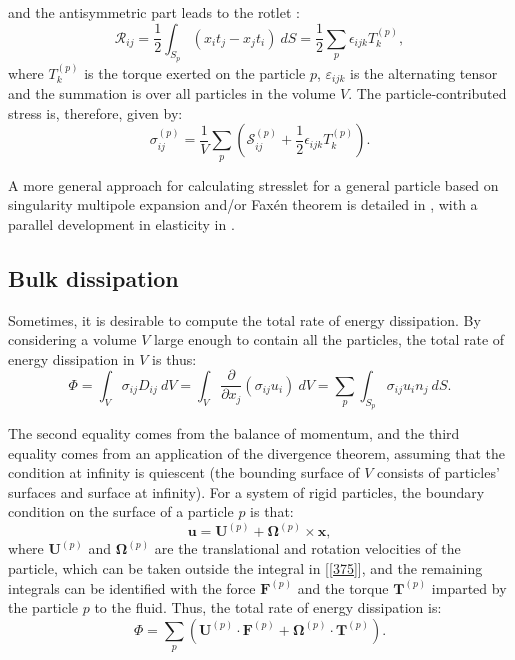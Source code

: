 \documentclass[english,fleqn,allpages]{ISTE_science}[2018/07/30]
\begin{document}
and the antisymmetric part leads to the rotlet \cite{batchelor70}:
\begin{equation}
\mathcal{R}_{ij}=\frac{1}{2}\int_{S_{p}}\left(x_{i}t_{j}-x_{j}t_{i}\right)\ dS=\frac{1}{2}\sum_{p}\epsilon_{ijk}T_{k}^{(p)},
\end{equation}
where $T_{k}^{(p)}$ is the torque exerted on the particle $p$, $\varepsilon_{ijk}$
is the alternating tensor and the summation is over all particles
in the volume $V$. The particle-contributed stress is, therefore,
given by: 
\begin{equation}
\sigma_{ij}^{(p)}=\frac{1}{V}\sum_{p}\left(\mathcal{S}_{ij}^{(p)}+\frac{1}{2}\epsilon_{ijk}T_{k}^{(p)}\right).\label{p-stress}
\end{equation}


A more general approach for calculating stresslet for a general particle
based on singularity multipole expansion and/or Faxén theorem is detailed
in \cite{kim91}, with a parallel development in elasticity in \cite{phan-thien94}.


\subsection{Bulk dissipation}

Sometimes, it is desirable to compute the total rate of energy dissipation.
By considering a volume $V$ large enough to contain all the particles,
the total rate of energy dissipation in $V$ is thus:
\begin{equation}
\Phi=\int_{V}\sigma_{ij}D_{ij}\ dV=\int_{V}\frac{\partial}{\partial x_{j}}\left(\sigma_{ij}u_{i}\right)\ dV={\displaystyle \sum\limits _{p}}\int_{S_{p}}\sigma_{ij}u_{i}n_{j}\ dS.\label{375}
\end{equation}

The second equality comes from the balance of momentum, and the third
equality comes from an application of the divergence theorem, assuming
that the condition at infinity is quiescent (the bounding surface
of $V$ consists of particles' surfaces and surface at infinity).
For a system of rigid particles, the boundary condition on the surface
of a particle $p$ is that: 
\begin{equation}
\mathbf{u}=\mathbf{U}^{(p)}+\mathbf{\Omega}^{(p)}\times\mathbf{x},
\end{equation}
where $\mathbf{U}^{(p)}$ and $\mathbf{\Omega}^{(p)}$ are the translational
and rotation velocities of the particle, which can be taken outside
the integral in [\ref{375}], and the remaining integrals can
be identified with the force $\mathbf{F}^{(p)}$ and the torque $\mathbf{T}^{(p)}$
imparted by the particle $p$ to the fluid. Thus, the total rate of
energy dissipation is: 
\begin{equation}
\Phi=\sum_{p}\left(\mathbf{U}^{(p)}\cdot\mathbf{F}^{(p)}+\mathbf{\Omega}^{(p)}\cdot\mathbf{T}^{(p)}\right).
\end{equation}
\end{document}
